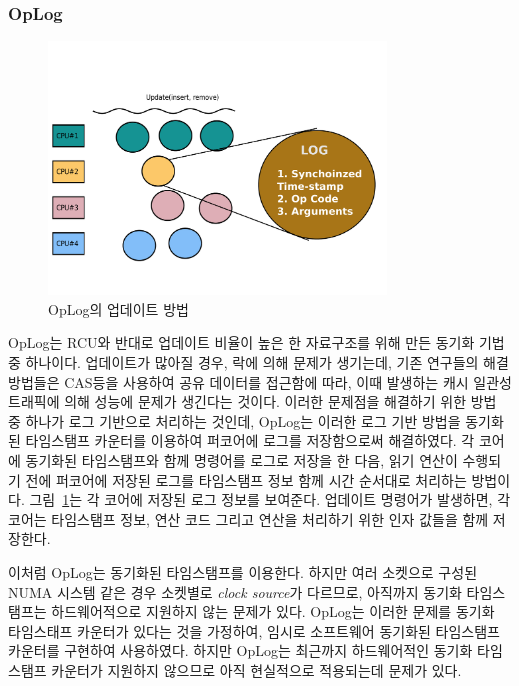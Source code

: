 \subsubsection{OpLog}

\begin{figure}[h]
    \centering
    \includegraphics[width=0.8\textwidth]{fig/oplog_log}
    \caption{OpLog의 업데이트 방법}
  \label{fig:oplog}
\end{figure}

OpLog는 RCU와 반대로 업데이트 비율이 높은 한 자료구조를 위해 만든 
동기화 기법 중 하나이다.
업데이트가 많아질 경우, 락에 의해 문제가 생기는데, 기존 연구들의 해결 방법들은 
CAS등을 사용하여 공유 데이터를 접근함에 따라, 이때 발생하는 캐시 일관성 트래픽에 의해 
성능에 문제가 생긴다는 것이다. 
이러한 문제점을 해결하기 위한 방법 중 하나가 로그 기반으로 처리하는 것인데, OpLog는 이러한 로그 기반 
방법을 동기화된 타임스탬프 카운터를 이용하여 퍼코어에 로그를 저장함으로써 해결하였다. 
각 코어에 동기화된 타임스탬프와 함께 명령어를 로그로 저장을 한 다음, 읽기 연산이 수행되기 전에 
퍼코어에 저장된 로그를 타임스탬프 정보 함께 시간 순서대로 처리하는 방법이다.
그림~\ref{fig:oplog}는 각 코어에 저장된 로그 정보를 보여준다.
업데이트 명령어가 발생하면, 각 코어는 타임스탬프 정보, 연산 코드 그리고 연산을 처리하기 위한 
인자 값들을 함께 저장한다.

이처럼 OpLog는 동기화된 타임스탬프를 이용한다. 
하지만 여러 소켓으로 구성된 NUMA 시스템 같은 경우 소켓별로 \textit{clock source}가 다르므로, 
아직까지 동기화 타임스탬프는 하드웨어적으로 지원하지 않는 문제가 있다.
OpLog는 이러한 문제를 동기화 타임스태프 카운터가 있다는 것을 가정하여, 
임시로 소프트웨어 동기화된 타임스탬프 카운터를 구현하여 사용하였다. 
하지만 OpLog는 최근까지 하드웨어적인 동기화 타임스탬프 카운터가 지원하지 않으므로 
아직 현실적으로 적용되는데 문제가 있다.
